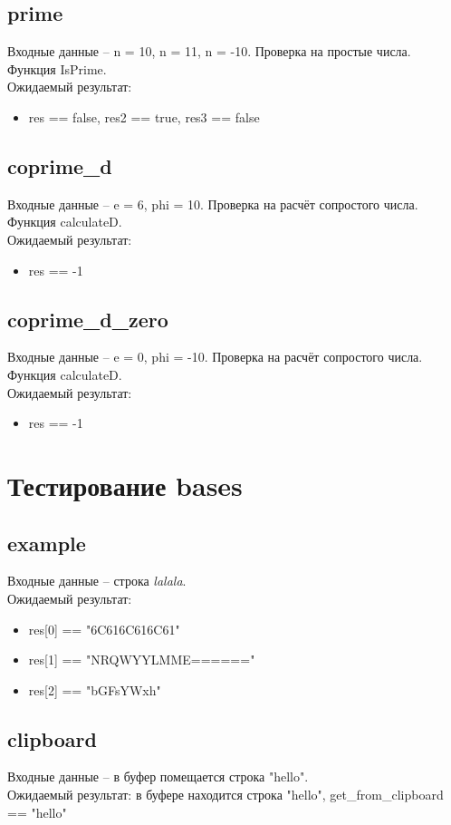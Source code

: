 \documentclass{article}
\begin{document}
\subsection{prime}
Входные данные -- n = 10, n = 11, n = -10. Проверка на простые числа. Функция IsPrime.\\
Ожидаемый результат: 
\begin{itemize}
    \item res == false, res2 == true, res3 == false 
\end{itemize}

\subsection{coprime\_d}
Входные данные -- e = 6, phi = 10. Проверка на расчёт сопростого числа. Функция calculateD.\\
Ожидаемый результат: 
\begin{itemize}
    \item res == -1 
\end{itemize}

\subsection{coprime\_d\_zero}
Входные данные -- e = 0, phi = -10. Проверка на расчёт сопростого числа. Функция calculateD.\\
Ожидаемый результат: 
\begin{itemize}
    \item res == -1 
\end{itemize}

\section{Тестирование bases}
\subsection{example}
Входные данные -- строка \textit{lalala}.\\
Ожидаемый результат: 
\begin{itemize}
    \item res[0] == "6C616C616C61"
    \item res[1] == "NRQWYYLMME======"
    \item res[2] == "bGFsYWxh" 
\end{itemize}

\subsection{clipboard}
Входные данные -- в буфер помещается строка "hello".\\
Ожидаемый результат: в буфере находится строка "hello", get\_from\_clipboard == "hello"
\end{document}
